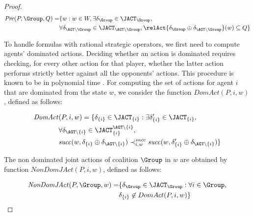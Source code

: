 \begin{proof}
\begin{align*}\mathit{Pre}(P, \Group, Q) = & \{ w : w\in W, \exists \delta_{\Group} \in \JACT_{\Group}, \\
& \forall \delta_{\AGT\setminus\Group}\in \JACT_{\AGT\setminus\Group},  \relAct{\delta_{\Group} \oplus    \delta_{\AGT\setminus\Group}}(w)\subseteq Q \}
\end{align*}

To handle formulas with rational strategic operators, we first need to compute agents' dominated actions.  
Deciding whether an action is dominated requires checking, for every other action for that player, whether the latter action performs strictly better against all the opponents’  actions. This procedure is known to be in polynomial time 
\cite{conitzer2005complexity,gilboa1993complexity}. 
For computing the set of actions for agent $i$ that are dominated from the state $w$, we consider the function $\mathit{DomAct}(P, i, w)$, defined as follows: 

\begin{align*}
\mathit{DomAct}&(P, i, w) = \{ \delta_{\{i\}} \in \JACT_{\{i\}} : \exists \delta_{\{i\}}' \in \JACT_{\{i\}}  , \\ &  \forall \delta_{\AGT\setminus\{i\}} \in \JACT_{\{i\}}^{\AGT\setminus\{i\}},   \\ & \mathit{succ}(w, \delta_{\{i\}}\oplus  \delta_{\AGT\setminus\{i\}} ) \prec_{i,w}^{\mathit{succ}}   \mathit{succ}(w, \delta_{\{i\}}'\oplus  \delta_{\AGT\setminus\{i\}} ) \}   \end{align*}

The non dominated joint actions of coalition $\Group$ in $w$ are obtained by function $\mathit{NonDomJAct}(P, i, w)$, defined as follows: 

\begin{align*}
\mathit{NonDomJAct}(P, \Group, w) = & \{ \delta_\Group \in \JACT_\Group:    \forall i \in \Group, \\
& \delta_{\{i\}}  \not \in DomAct(P,i,w)\}   \end{align*}



\end{proof}
